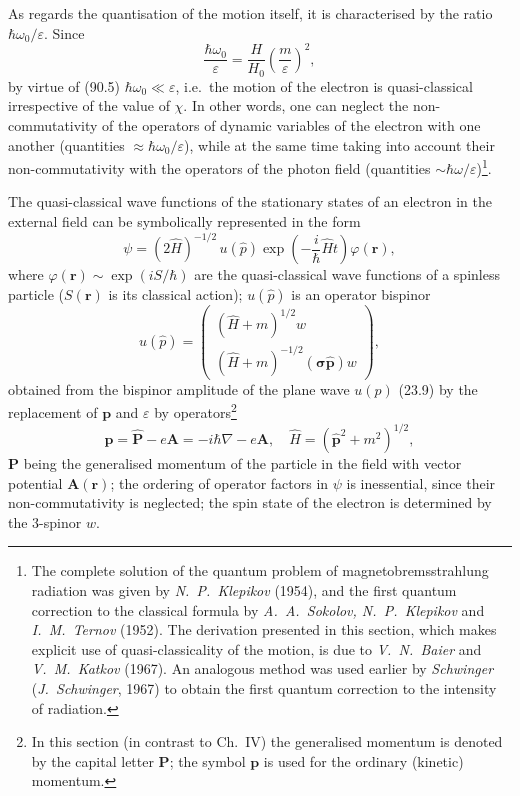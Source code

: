 As regards the quantisation of the motion itself, it is characterised by the ratio $\hbar\omega_0/\varepsilon$. Since
\[
\frac{\hbar\omega_0}{\varepsilon} = \frac{H}{H_0}\left(\frac{m}{\varepsilon}\right)^{\!2},
\]
by virtue of (90.5) $\hbar\omega_0 \ll \varepsilon$, i.e.\ the motion of the electron is quasi-classical irrespective of the value of $\chi$. In other words, one can neglect the non-commutativity of the operators of dynamic variables of the electron with one another (quantities $\approx \hbar\omega_0/\varepsilon$), while at the same time taking into account their non-commutativity with the operators of the photon field (quantities $\sim \hbar\omega/\varepsilon$)\footnote{The complete solution of the quantum problem of magnetobremsstrahlung radiation was given by \emph{N.~P.~Klepikov} (1954), and the first quantum correction to the classical formula by \emph{A.~A.~Sokolov, N.~P.~Klepikov} and \emph{I.~M.~Ternov} (1952). The derivation presented in this section, which makes explicit use of quasi-classicality of the motion, is due to \emph{V.~N.~Baier} and \emph{V.~M.~Katkov} (1967). An analogous method was used earlier by \emph{Schwinger} (\emph{J.~Schwinger}, 1967) to obtain the first quantum correction to the intensity of radiation.}.

The quasi-classical wave functions of the stationary states of an electron in the external field can be symbolically represented in the form
\begin{equation}
\psi = (2\hat{H})^{-1/2}\,u(\hat{p})\exp\!\left(-\frac{i}{\hbar}\hat{H}t\right)\varphi(\mathbf{r}),
\label{eq:90.6}
\end{equation}
where $\varphi(\mathbf{r}) \sim \exp(iS/\hbar)$ are the quasi-classical wave functions of a spinless particle ($S(\mathbf{r})$ is its classical action); $u(\hat{p})$ is an operator bispinor
\[
u(\hat{p}) = \begin{pmatrix} (\hat{H}+m)^{1/2}w \\ (\hat{H}+m)^{-1/2}(\boldsymbol{\sigma}\hat{\mathbf{p}})w \end{pmatrix},
\]
obtained from the bispinor amplitude of the plane wave $u(p)$ (23.9) by the replacement of $\mathbf{p}$ and $\varepsilon$ by operators\footnote{In this section (in contrast to Ch.~IV) the generalised momentum is denoted by the capital letter $\mathbf{P}$; the symbol $\mathbf{p}$ is used for the ordinary (kinetic) momentum.}
\[
\hat{\mathbf{p}} = \hat{\mathbf{P}} - e\mathbf{A} = -i\hbar\nabla - e\mathbf{A}, \quad \hat{H} = (\hat{\mathbf{p}}^2 + m^2)^{1/2},
\]
$\mathbf{P}$ being the generalised momentum of the particle in the field with vector potential $\mathbf{A}(\mathbf{r})$; the ordering of operator factors in $\psi$ is inessential, since their non-commutativity is neglected; the spin state of the electron is determined by the 3-spinor $w$.

